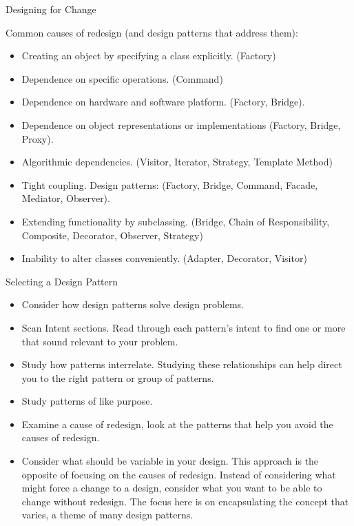 \documentclass{beamer}
\begin{document}
\begin{frame}[fragile]{Designing for Change}


Common causes of redesign (and design patterns that address them):
\begin{itemize}
\item Creating an object by specifying a class explicitly. (Factory)
\item Dependence on specific operations. (Command)
\item Dependence on hardware and software platform. (Factory, Bridge).
\item Dependence on object representations or implementations (Factory, Bridge, Proxy).
\item Algorithmic dependencies. (Visitor, Iterator, Strategy, Template Method)
\item Tight coupling. Design patterns: (Factory, Bridge, Command, Facade, Mediator, Observer).
\item Extending functionality by subclassing.
(Bridge, Chain of Responsibility, Composite, Decorator, Observer, Strategy)
\item Inability to alter classes conveniently. (Adapter, Decorator, Visitor)
\end{itemize}


\end{frame}

\begin{frame}[fragile]{Selecting a Design Pattern}


\begin{itemize}
\item Consider how design patterns solve design problems.
\item Scan Intent sections.  Read through each pattern's intent to find one or more that sound relevant to your problem. 
\item Study how patterns interrelate.  Studying these relationships can help direct you to the right pattern or group of patterns.
\item Study patterns of like purpose. 
\item Examine a cause of redesign, look at the patterns that help you avoid the causes of redesign.
\item Consider what should be variable in your design. This approach is the opposite of focusing on the causes of redesign. Instead of considering what might force a change to a design, consider what you want to be able to change without redesign. The focus here is on encapsulating the concept that varies, a theme of many design patterns.
\end{itemize}


\end{frame}
\end{document}
